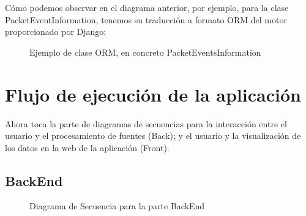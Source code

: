 Cómo podemos observar en el diagrama anterior, por ejemplo, para la clase PacketEventInformation, tenemos su traducción a formato ORM del motor proporcionado por Django:

\begin{figure}[H]

\caption{Ejemplo de clase ORM, en concreto PacketEventsInformation}
\end{figure}

\section{Flujo de ejecución de la aplicación}

Ahora toca la parte de diagramas de secuencias para la interacción entre el usuario y el procesamiento de fuentes (Back); y el usuario y la visualización de los datos en la web de la aplicación (Front).\\
\pagebreak
\subsection{BackEnd}

\begin{figure}[h]
\caption{Diagrama de Secuencia para la parte BackEnd}
\end{figure}

\pagebreak

